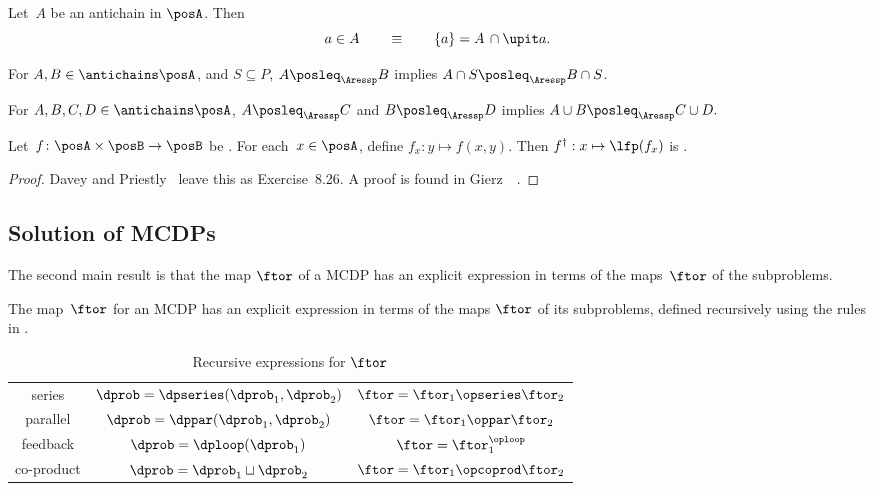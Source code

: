 \begin{lemma}
\label{lem:antichain-write}Let~$A$ be an antichain in $\posA$.
Then
\[
a\in A\qquad\equiv\qquad\{a\}=A\,\cap\upit a.
\]
\end{lemma}

\begin{lemma}
\label{lem:antichain_inter}For $A,B\in\antichains\posA$, and $S\subseteq P$,
$A\posleq_{\Aressp}B$ implies $A\cap S\posleq_{\Aressp}B\cap S$. 
\end{lemma}

\begin{lemma}
\label{lem:antichain_union}For $A,B,C,D\in\antichains\posA$, $A\posleq_{\Aressp}C$
and $B\posleq_{\Aressp}D$ implies $A\cup B\posleq_{\Aressp}C\cup D.$
\end{lemma}

\begin{lemma}
\label{lem:dagger}Let~$f\colon\posA\times\posB\rightarrow\posB$
be \scottcontinuous. For each~$x\in\posA$, define $f_{x}:y\mapsto f(x,y).$
Then $f^{\dagger}:x\mapsto\lfp(f_{x})$ is \scottcontinuous.
\end{lemma}
\begin{proof}
Davey and Priestly~\cite{davey02} leave this as Exercise~8.26.
A proof is found in Gierz~\etal~\cite[Exercise II-2.29]{gierz03continuous}.
\end{proof}




\subsection{Solution of MCDPs\label{sec:Solution-of-Monotone}}

The second main result is that the map $\ftor$ of a MCDP has an explicit
expression in terms of the maps~$\ftor$ of the subproblems.  

\noindent 

\begin{theorem}
\label{thm:CDP-solvig}The map~$\ftor$ for an MCDP has an explicit
expression in terms of the maps $\ftor$ of its subproblems, defined
recursively using the rules in .
\end{theorem}

\begin{table}[h]
\begin{centering}
\caption{Recursive expressions for $\ftor$\label{tab:Correspondence}}
\par\end{centering}
\centering{}\setlength\extrarowheight{5pt}\normalsize
\begin{tabular}{ccc}
series & $\dprob=\dpseries(\dprob_{1},\dprob_{2})$ & $\ftor=\ftor_{1}\opseries\ftor_{2}$\tabularnewline
parallel & $\dprob=\dppar(\dprob_{1},\dprob_{2})$ & $\ftor=\ftor_{1}\oppar\ftor_{2}$\tabularnewline
feedback & $\dprob=\dploop(\dprob_{1})$ & $\ftor=\ftor_{1}^{\oploop}$\tabularnewline
co-product & $\dprob=\dprob_{1}\sqcup\dprob_{2}$ & $\ftor=\ftor_{1}\opcoprod\ftor_{2}$\tabularnewline
\end{tabular}
\end{table}

